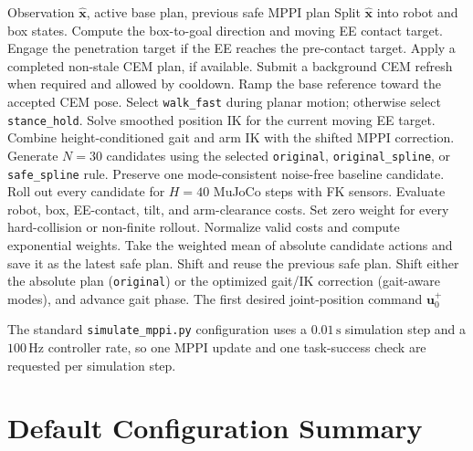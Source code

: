 \documentclass[11pt,a4paper]{article}
\newcommand{\code}[1]{\texttt{#1}}
\begin{document}
\begin{algorithm}[ht]
\caption{\code{push\_box} CEM-guided whole-body MPPI update}
\label{alg:push_box_mppi}
\begin{algorithmic}[1]
  \REQUIRE Observation $\hat{\bm{x}}$, active base plan, previous safe MPPI plan
  \STATE Split $\hat{\bm{x}}$ into robot and box states.
  \STATE Compute the box-to-goal direction and moving EE contact target.
  \STATE Engage the penetration target if the EE reaches the pre-contact target.
  \STATE Apply a completed non-stale CEM plan, if available.
  \STATE Submit a background CEM refresh when required and allowed by cooldown.
  \STATE Ramp the base reference toward the accepted CEM pose.
  \STATE Select \code{walk\_fast} during planar motion; otherwise select
         \code{stance\_hold}.
  \STATE Solve smoothed position IK for the current moving EE target.
  \STATE Combine height-conditioned gait and arm IK with the shifted MPPI
         correction.
  \STATE Generate $N=30$ candidates using the selected
         \code{original}, \code{original\_spline}, or
         \code{safe\_spline} rule.
  \STATE Preserve one mode-consistent noise-free baseline candidate.
  \STATE Roll out every candidate for $H=40$ MuJoCo steps with FK sensors.
  \STATE Evaluate robot, box, EE-contact, tilt, and arm-clearance costs.
  \STATE Set zero weight for every hard-collision or non-finite rollout.
    \STATE Normalize valid costs and compute exponential weights.
    \STATE Take the weighted mean of absolute candidate actions and save it as
           the latest safe plan.
  \ELSE
    \STATE Shift and reuse the previous safe plan.
  \ENDIF
  \STATE Shift either the absolute plan (\code{original}) or the optimized
         gait/IK correction (gait-aware modes), and advance gait phase.
  \RETURN The first desired joint-position command $\bm{u}^{+}_0$
\end{algorithmic}
\end{algorithm}

The standard \code{simulate\_mppi.py} configuration uses a $0.01\,\mathrm{s}$
simulation step and a $100\,\mathrm{Hz}$ controller rate, so one MPPI update
and one task-success check are requested per simulation step.

\section{Default Configuration Summary}
\end{document}
